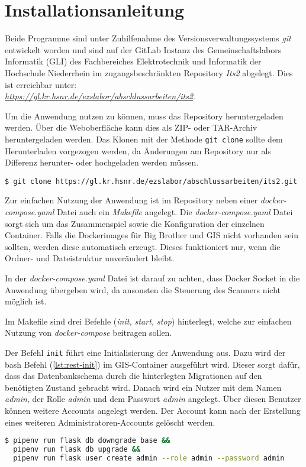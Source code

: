\section{Installationsanleitung}
Beide Programme sind unter Zuhilfenahme des Versionsverwaltungssystems \textit{git} entwickelt worden und sind auf der GitLab Instanz des Gemeinschaftslabors Informatik (GLI) des Fachbereiches Elektrotechnik und Informatik der Hochschule Niederrhein im zugangsbeschränkten Repository \textit{Its2} abgelegt. Dies ist erreichbar unter: \\ \textit{\url{https://gl.kr.hsnr.de/ezslabor/abschlussarbeiten/its2}}.

Um die Anwendung nutzen zu können, muss das Repository heruntergeladen werden.
Über die Weboberfläche kann dies als ZIP- oder TAR-Archiv heruntergeladen werden. Das Klonen mit der Methode \texttt{git clone} sollte dem Herunterladen vorgezogen werden, da Änderungen am Repository nur als Differenz herunter- oder hochgeladen werden müssen.

\begin{lstlisting}[caption={git clone (bash)}, captionpos=b, label={lst:git-clone}]
$ git clone https://gl.kr.hsnr.de/ezslabor/abschlussarbeiten/its2.git
\end{lstlisting}

Zur einfachen Nutzung der Anwendung ist im Repository neben einer \textit{docker-compose.yaml} Datei auch ein \textit{Makefile} angelegt. Die \textit{docker-compose.yaml} Datei sorgt sich um das Zusammenspiel sowie die Konfiguration der einzelnen Container. Falls die Dockerimages für Big Brother und GIS nicht vorhanden sein sollten, werden diese automatisch erzeugt. Dieses funktioniert nur, wenn die Ordner- und Dateistruktur unverändert bleibt.

In der \textit{docker-compose.yaml} Datei ist darauf zu achten, dass Docker Socket in die Anwendung übergeben wird, da ansonsten die Steuerung des Scanners nicht möglich ist.

Im Makefile sind drei Befehle (\textit{init, start, stop}) hinterlegt, welche zur einfachen Nutzung von \textit{docker-compose} beitragen sollen.

Der Befehl \texttt{init} führt eine Initialisierung der Anwendung aus. Dazu wird der bash Befehl (\autoref{lst:rest-init}) im GIS-Container ausgeführt wird. Dieser sorgt dafür, dass das Datenbankschema durch die hinterlegten Migrationen auf den benötigten Zustand gebracht wird. Danach wird ein Nutzer mit dem Namen \textit{admin}, der Rolle \textit{admin} und dem Passwort \textit{admin} angelegt. Über diesen Benutzer können weitere Accounts angelegt werden. Der Account kann nach der Erstellung eines weiteren Administratoren-Accounts gelöscht werden.
\begin{lstlisting}[language=bash, caption={Initalisierung REST-Interface (bash)}, captionpos=b, label={lst:rest-init}]
$ pipenv run flask db downgrade base && 
  pipenv run flask db upgrade && 
  pipenv run flask user create admin --role admin --password admin
\end{lstlisting}

